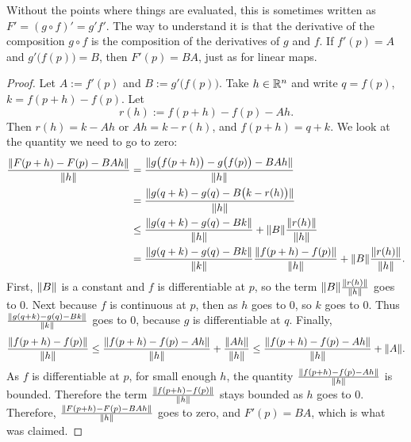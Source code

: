 Without the points where things are evaluated, this is sometimes written as
$F' = {(g \circ f)}' = g' f'$.  The way to
understand it is that the derivative of the composition $g \circ f$
is the composition of the derivatives of $g$ and $f$.  If
$f'(p) = A$ and $g'\bigl(f(p)\bigr) = B$, then $F'(p) = BA$,
just as for linear maps.

\begin{proof}
Let $A := f'(p)$ and $B := g'\bigl(f(p)\bigr)$.  Take $h \in {\mathbb{R}}^n$
and write $q = f(p)$, $k = f(p+h)-f(p)$.  Let
\begin{equation*}
r(h) := f(p+h)-f(p) - A h . %
\end{equation*}
Then $r(h) = k-Ah$ or $Ah = k-r(h)$, and $f(p+h) = q+k$.
We look at the quantity we need to go
to zero:
\begin{equation*}
\begin{split}
\frac{\lVert {F(p+h)-F(p) - BAh} \rVert}{\lVert {h} \rVert}
& =
\frac{\lVert {g\bigl(f(p+h)\bigr)-g\bigl(f(p)\bigr) - BAh} \rVert}{\lVert {h} \rVert}
\\
& =
\frac{\lVert {g(q+k)-g(q) - B\bigl(k-r(h)\bigr)} \rVert}{\lVert {h} \rVert}
\\
& \leq
\frac
{\lVert {g(q+k)-g(q) - Bk} \rVert}
{\lVert {h} \rVert}
+
\lVert {B} \rVert
\frac
{\lVert {r(h)} \rVert}
{\lVert {h} \rVert}
\\
& =
\frac
{\lVert {g(q+k)-g(q) - Bk} \rVert}
{\lVert {k} \rVert}
\frac
{\lVert {f(p+h)-f(p)} \rVert}
{\lVert {h} \rVert}
+
\lVert {B} \rVert
\frac
{\lVert {r(h)} \rVert}
{\lVert {h} \rVert} .
\end{split}
\end{equation*}
First, $\lVert {B} \rVert$ is a constant and $f$ is differentiable at $p$,
so
the term $\lVert {B} \rVert\frac{\lVert {r(h)} \rVert}{\lVert {h} \rVert}$ goes to 0.
Next because $f$ is continuous at $p$, then as
$h$ goes to 0, so $k$ goes to 0.  Thus
$\frac
{\lVert {g(q+k)-g(q) - Bk} \rVert}
{\lVert {k} \rVert}$ goes to 0, because $g$ is differentiable at $q$.
Finally,
\begin{equation*}
\frac
{\lVert {f(p+h)-f(p)} \rVert}
{\lVert {h} \rVert}
\leq
\frac
{\lVert {f(p+h)-f(p)-Ah} \rVert}
{\lVert {h} \rVert}
+
\frac
{\lVert {Ah} \rVert}
{\lVert {h} \rVert}
\leq
\frac
{\lVert {f(p+h)-f(p)-Ah} \rVert}
{\lVert {h} \rVert}
+
\lVert {A} \rVert .
\end{equation*}
As $f$ is differentiable at $p$,
for small enough $h$, the quantity
$\frac{\lVert {f(p+h)-f(p)-Ah} \rVert}{\lVert {h} \rVert}$ is bounded.  Therefore the
term
$
\frac
{\lVert {f(p+h)-f(p)} \rVert}
{\lVert {h} \rVert}
$
stays bounded as $h$ goes to 0.  Therefore, 
$\frac{\lVert {F(p+h)-F(p) - BAh} \rVert}{\lVert {h} \rVert}$ goes to zero, and
$F'(p) = BA$, which is what was claimed.
\end{proof}

